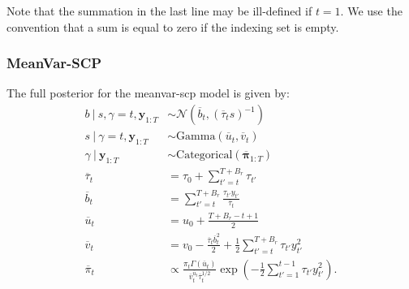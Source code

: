 Note that the summation in the last line may be ill-defined if $t = 1$. We use the convention that a sum is equal to zero if the indexing set is empty.

\subsubsection{MeanVar-SCP}

The full posterior for the meanvar-scp model is given by:
\begin{align*}
    b \:|\: s, \gamma = t, \mathbf{y}_{1:T} &\sim \mathcal{N}(\overline{b}_t, (\overline{\tau}_t s)^{-1}) \\
    s \:|\: \gamma = t, \mathbf{y}_{1:T} &\sim \text{Gamma}(\overline{u}_t, \overline{v}_t) \\
    \gamma \:|\: \mathbf{y}_{1:T} &\sim \text{Categorical}(\overline{\boldsymbol{\pi}}_{1:T}) \\
    \overline{\tau}_t &= \tau_0 + \sum_{t' = t}^{T+B_r} \tau_{t'}  \\
    \overline{b}_t &=  \sum_{t'=t}^{T+B_r} \frac{\tau_{t'} y_{t'}}{\overline{\tau}_t} \\
    \overline{u}_t &= u_0 + \frac{T +B_r - t + 1}{2} \\
    \overline{v}_t &= v_0 - \frac{\overline{\tau}_t\overline{b}^2_t}{2} + \frac{1}{2} \sum_{t'=t}^{T+B_r} \tau_{t'}y_{t'}^2 \\
    \overline{\pi}_t &\propto \frac{\pi_t\Gamma(\overline{u}_t)}{\overline{v}_t^{\overline{u}_t}\overline{\tau}_t^{1/2} } \exp\left(-\frac{1}{2}\sum_{t'=1}^{t-1} \tau_{t'}y^2_{t'}\right).
\end{align*}

